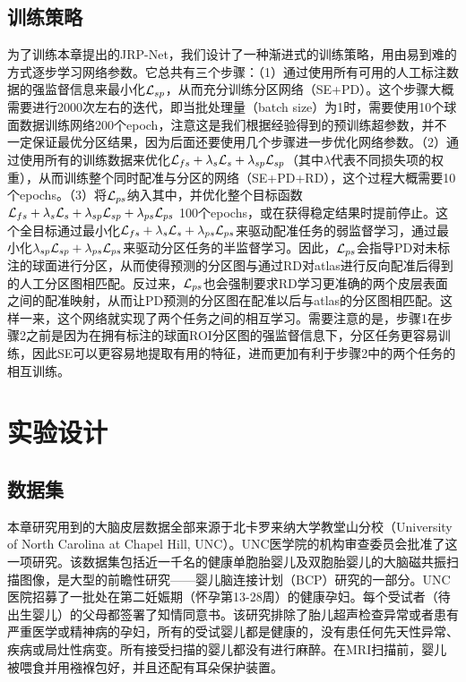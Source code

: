 \subsection{训练策略}
为了训练本章提出的JRP-Net，我们设计了一种渐进式的训练策略，用由易到难的方式逐步学习网络参数。它总共有三个步骤：（1）通过使用所有可用的人工标注数据的强监督信息来最小化${\cal L}_{sp}$，从而充分训练分区网络（SE+PD）。这个步骤大概需要进行2000次左右的迭代，即当批处理量（batch size）为1时，需要使用10个球面数据训练网络200个epoch，注意这是我们根据经验得到的预训练超参数，并不一定保证最优分区结果，因为后面还要使用几个步骤进一步优化网络参数。（2）通过使用所有的训练数据来优化${\cal L}_{fs}+\lambda_s {\cal L}_s+\lambda_{sp}{\cal L}_{sp}$（其中$\lambda$代表不同损失项的权重），从而训练整个同时配准与分区的网络（SE+PD+RD），这个过程大概需要10个epochs。（3）将${\cal L}_{ps}$纳入其中，并优化整个目标函数$ {\cal L}_{fs}+\lambda_s{\cal L}_s+\lambda_{sp}{\cal L}_{sp}+\lambda_{ps}{\cal L}_{ps}$ 100个epochs，或在获得稳定结果时提前停止。这个全目标通过最小化${\cal L}_{fs}+\lambda_s{\cal L}_s+\lambda_{ps}{\cal L}_{ps}$来驱动配准任务的弱监督学习，通过最小化$ \lambda_{sp}{\cal L}_{sp}+\lambda_{ps}{\cal L}_{ps}$来驱动分区任务的半监督学习。因此，${\cal L}_{ps}$会指导PD对未标注的球面进行分区，从而使得预测的分区图与通过RD对atlas进行反向配准后得到的人工分区图相匹配。反过来，${\cal L}_{ps}$也会强制要求RD学习更准确的两个皮层表面之间的配准映射，从而让PD预测的分区图在配准以后与atlas的分区图相匹配。这样一来，这个网络就实现了两个任务之间的相互学习。需要注意的是，步骤1在步骤2之前是因为在拥有标注的球面ROI分区图的强监督信息下，分区任务更容易训练，因此SE可以更容易地提取有用的特征，进而更加有利于步骤2中的两个任务的相互训练。


\section{实验设计}
\subsection{数据集}
本章研究用到的大脑皮层数据全部来源于北卡罗来纳大学教堂山分校（University of North Carolina at Chapel Hill, UNC）。UNC医学院的机构审查委员会批准了这一项研究。该数据集包括近一千名的健康单胞胎婴儿及双胞胎婴儿的大脑磁共振扫描图像，是大型的前瞻性研究——婴儿脑连接计划（BCP）研究的一部分。UNC医院招募了一批处在第二妊娠期（怀孕第13-28周）的健康孕妇。每个受试者（待出生婴儿）的父母都签署了知情同意书。该研究排除了胎儿超声检查异常或者患有严重医学或精神病的孕妇，所有的受试婴儿都是健康的，没有患任何先天性异常、疾病或局灶性病变\cite{gilmore2012longitudinal}。所有接受扫描的婴儿都没有进行麻醉。在MRI扫描前，婴儿被喂食并用襁褓包好，并且还配有耳朵保护装置。

